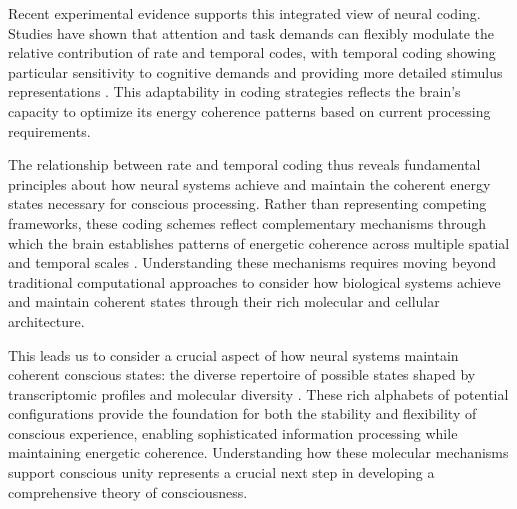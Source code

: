 Recent experimental evidence supports this integrated view of neural coding. Studies have shown that attention and task demands can flexibly modulate the relative contribution of rate and temporal codes, with temporal coding showing particular sensitivity to cognitive demands and providing more detailed stimulus representations \cite{zhang2023adaptive}. This adaptability in coding strategies reflects the brain's capacity to optimize its energy coherence patterns based on current processing requirements.

The relationship between rate and temporal coding thus reveals fundamental principles about how neural systems achieve and maintain the coherent energy states necessary for conscious processing. Rather than representing competing frameworks, these coding schemes reflect complementary mechanisms through which the brain establishes patterns of energetic coherence across multiple spatial and temporal scales \cite{lisman2013theta}. Understanding these mechanisms requires moving beyond traditional computational approaches to consider how biological systems achieve and maintain coherent states through their rich molecular and cellular architecture.

This leads us to consider a crucial aspect of how neural systems maintain coherent conscious states: the diverse repertoire of possible states shaped by transcriptomic profiles and molecular diversity \cite{zhang2023adaptive}. These rich alphabets of potential configurations provide the foundation for both the stability and flexibility of conscious experience, enabling sophisticated information processing while maintaining energetic coherence. Understanding how these molecular mechanisms support conscious unity represents a crucial next step in developing a comprehensive theory of consciousness.